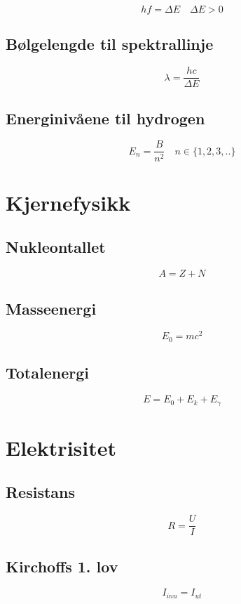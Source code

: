 \documentclass{article}
\begin{document}
$$hf=\Delta E \quad \Delta E > 0$$

\subsection{B{\o}lgelengde til spektrallinje}

$$\lambda=\frac{hc}{\Delta E}$$

\subsection{Energiniv{\aa}ene til hydrogen}

$$E_n=\frac{B}{n^2} \quad n \in \{1, 2, 3, ..\}$$

\section{Kjernefysikk}

\subsection{Nukleontallet}

$$A=Z+N$$

\subsection{Masseenergi}

$$E_0=mc^2$$

\subsection{Totalenergi}

$$E=E_0+E_k+E_{\gamma}$$

\section{Elektrisitet}

\subsection{Resistans}

$$R=\frac{U}{I}$$

\subsection{Kirchoffs 1. lov}

$$I_{inn}=I_{ut}$$
\end{document}

